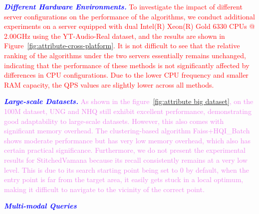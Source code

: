 \documentclass[sigconf, nonacm]{acmart}
\begin{document}
	\textit{\textbf{\textcolor{blue}{Different Hardware Environments.}}} 
	\textcolor{red}{To investigate the impact of different server configurations on the performance of the algorithms, we conduct additional experiments on a server equipped with dual Intel(R) Xeon(R) Gold 6330 CPUs @ 2.00GHz using the YT-Audio-Real dataset, and the results are shown in Figure~\ref{fig:attribute-cross-platform}. It is not difficult to see that the relative ranking of the algorithms under the two servers essentially remains unchanged, indicating that the performance of these methods is not significantly affected by differences in CPU configurations. Due to the lower CPU frequency and smaller RAM capacity, the QPS values are slightly lower across all methods.}

	\textit{\textbf{\textcolor{blue}{Large-scale Datasets.}}} 
	\textcolor{violet}{As shown in the figure~\ref{fig:attribute big dataset}, on the 100M dataset, UNG and NHQ still exhibit excellent performance, demonstrating good adaptability to large-scale datasets. However, this also comes with significant memory overhead. The clustering-based algorithm Faiss+HQI\_Batch shows moderate performance but has very low memory overhead, which also has certain practical significance. Furthermore, we do not present the experimental results for StitchedVamana because its recall consistently remains at a very low level. This is due to its search starting point being set to 0 by default, when the entry point is far from the target area, it easily gets stuck in a local optimum, making it difficult to navigate to the vicinity of the correct point.}
	
\textit{\textbf{\textcolor{blue}{Multi-modal Queries}}} 
\end{document}
